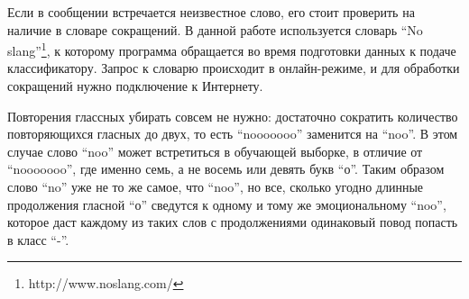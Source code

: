 Если в сообщении встречается неизвестное слово, его стоит проверить на наличие в словаре сокращений. В данной
работе используется словарь ``No slang''\footnote{http://www.noslang.com/}, к которому программа
обращается во время подготовки данных к подаче классификатору. Запрос к словарю происходит в
онлайн-режиме, и для обработки сокращений нужно подключение к Интернету.

Повторения глассных убирать совсем не нужно: достаточно сократить количество повторяющихся гласных
до двух, то есть ``nooooooo'' заменится на ``noo''. В этом случае слово ``noo'' может встретиться в
обучающей выборке, в отличие от ``nooooooo'', где именно семь, а не восемь или девять букв
``о''. Таким образом слово ``no'' уже не то же самое, что ``noo'', но все, сколько угодно длинные
продолжения гласной ``о'' сведутся к одному и тому же эмоциональному ``noo'', которое даст каждому
из таких слов с продолжениями одинаковый повод попасть в класс ``-''.
